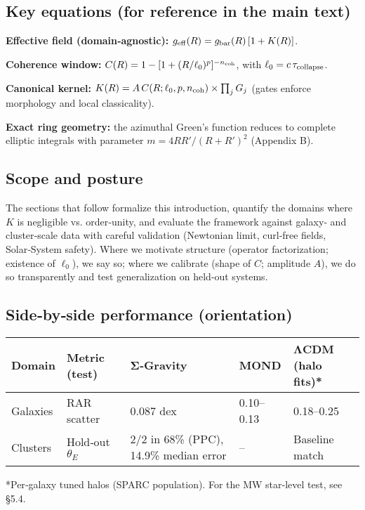 \documentclass[11pt,a4paper]{article}
\begin{document}
\subsection{Key equations (for reference in the main text)}


\textbf{Effective field (domain‑agnostic):} $g_{\rm eff}(R) = g_{\rm bar}(R)\,[1 + K(R)]$.


\textbf{Coherence window:} $C(R) = 1 - [1 + (R/\ell_0)^p]^{-n_{\rm coh}}$, with $\ell_0 = c\,\tau_{\rm collapse}$.


\textbf{Canonical kernel:} $K(R) = A\,C(R;\ell_0,p,n_{\rm coh}) \times \prod_j G_j$ (gates enforce morphology and local classicality).


\textbf{Exact ring geometry:} the azimuthal Green's function reduces to complete elliptic integrals with parameter $m = 4RR'/(R+R')^2$ (Appendix B).


\subsection{Scope and posture}


The sections that follow formalize this introduction, quantify the domains where $K$ is negligible vs. order‑unity, and evaluate the framework against galaxy‑ and cluster‑scale data with careful validation (Newtonian limit, curl‑free fields, Solar‑System safety). Where we motivate structure (operator factorization; existence of $\ell_0$), we say so; where we calibrate (shape of $C$; amplitude $A$), we do so transparently and test generalization on held‑out systems.


\subsection{Side‑by‑side performance (orientation)}


\begin{table}[h]
\centering
\begin{tabular}{lllll}
\toprule
Domain & Metric (test) & Σ‑Gravity & MOND & ΛCDM (halo fits)* \\
\midrule
Galaxies & RAR scatter & 0.087 dex & 0.10–0.13 & 0.18–0.25 \\
Clusters & Hold‑out $\theta_E$ & 2/2 in 68\% (PPC), 14.9\% median error & – & Baseline match \\
\bottomrule
\end{tabular}
\end{table}


*Per‑galaxy tuned halos (SPARC population). For the MW star‑level test, see §5.4.
\end{document}
